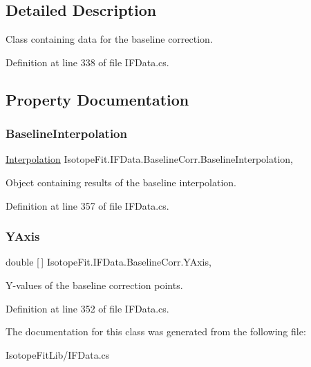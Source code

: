 \subsection{Detailed Description}
Class containing data for the baseline correction. 



Definition at line 338 of file I\+F\+Data.\+cs.



\subsection{Property Documentation}
\mbox{\label{class_isotope_fit_1_1_i_f_data_1_1_baseline_corr_a914a7b2ac945482a7c73874fbff45951}} 
\subsubsection{\texorpdfstring{Baseline\+Interpolation}{BaselineInterpolation}}
{\footnotesize\ttfamily \hyperlink{class_isotope_fit_1_1_interpolation}{Interpolation} Isotope\+Fit.\+I\+F\+Data.\+Baseline\+Corr.\+Baseline\+Interpolation\hspace{0.3cm}{\ttfamily [get]}, {\ttfamily [set]}}



Object containing results of the baseline interpolation. 



Definition at line 357 of file I\+F\+Data.\+cs.

\mbox{\label{class_isotope_fit_1_1_i_f_data_1_1_baseline_corr_aa71067f79827da27836daa705413133c}} 
\subsubsection{\texorpdfstring{Y\+Axis}{YAxis}}
{\footnotesize\ttfamily double \mbox{[}$\,$\mbox{]} Isotope\+Fit.\+I\+F\+Data.\+Baseline\+Corr.\+Y\+Axis\hspace{0.3cm}{\ttfamily [get]}, {\ttfamily [set]}}



Y-\/values of the baseline correction points. 



Definition at line 352 of file I\+F\+Data.\+cs.



The documentation for this class was generated from the following file\+:\begin{DoxyCompactItemize}
\item 
Isotope\+Fit\+Lib/I\+F\+Data.\+cs\end{DoxyCompactItemize}
